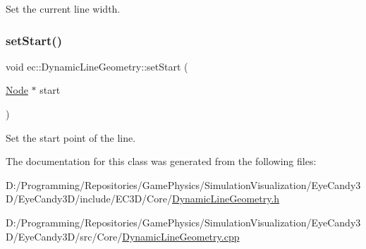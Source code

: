 Set the current line width. 

\mbox{\label{classec_1_1_dynamic_line_geometry_a7354615fc961c1d6d6e9ec09bdb5bdf9}} 
\subsubsection{\texorpdfstring{set\+Start()}{setStart()}}
{\footnotesize\ttfamily void ec\+::\+Dynamic\+Line\+Geometry\+::set\+Start (\begin{DoxyParamCaption}\item[{\mbox{\hyperlink{classec_1_1_node}{Node}} $\ast$}]{start }\end{DoxyParamCaption})}



Set the start point of the line. 



The documentation for this class was generated from the following files\+:\begin{DoxyCompactItemize}
\item 
D\+:/\+Programming/\+Repositories/\+Game\+Physics/\+Simulation\+Visualization/\+Eye\+Candy3\+D/\+Eye\+Candy3\+D/include/\+E\+C3\+D/\+Core/\mbox{\hyperlink{_dynamic_line_geometry_8h}{Dynamic\+Line\+Geometry.\+h}}\item 
D\+:/\+Programming/\+Repositories/\+Game\+Physics/\+Simulation\+Visualization/\+Eye\+Candy3\+D/\+Eye\+Candy3\+D/src/\+Core/\mbox{\hyperlink{_dynamic_line_geometry_8cpp}{Dynamic\+Line\+Geometry.\+cpp}}\end{DoxyCompactItemize}
